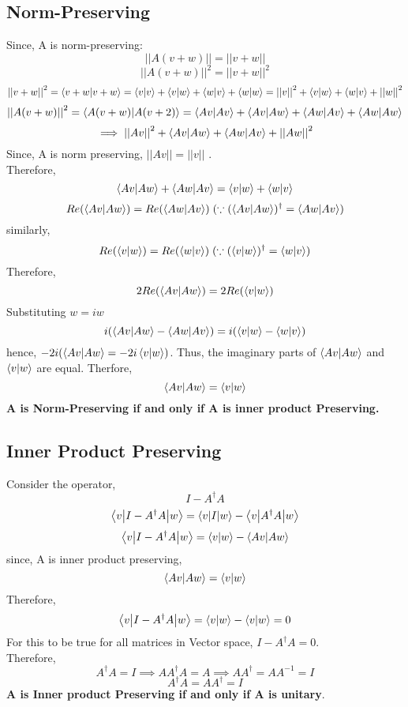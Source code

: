 \documentclass[11pt, a4paper]{article}
\begin{document}
\subsection{Norm-Preserving}
Since, A is norm-preserving:
\[
    \left\vert \left\vert A(v+w) \right\vert  \right\vert = \left\vert \left\vert v+w \right\vert  \right\vert 
\]
\[
    \left\vert \left\vert A(v+w) \right\vert  \right\vert^2 = \left\vert \left\vert v+w \right\vert  \right\vert^2
\]
\[
    \left\vert \left\vert v+w \right\vert  \right\vert^2 = \bkt{v+w}{v+w} = \bkt{v}{v}+ \bkt{v}{w}+\bkt{w}{v}+ \bkt{w}{w} = \left\vert \left\vert v \right\vert  \right\vert ^2 + \bkt{v}{w} + \bkt{w}{v}+ \left\vert \left\vert w \right\vert  \right\vert ^2
\]
\[
    \left\vert \left\vert A(v+w) \right\vert  \right\vert ^2 = \bkt{A(v+w)}{A(v+2)} = \bkt{Av}{Av} + \bkt{Av}{Aw} + \bkt{Aw}{Av}+ \bkt{Aw}{Aw} 
\]
\[
    \implies  \left\vert \left\vert Av \right\vert  \right\vert ^2 + \bkt{Av}{Aw} + \bkt{Aw}{Av}+ \left\vert \left\vert Aw \right\vert  \right\vert ^2
\]
Since, A is norm preserving, \(\left\vert \left\vert Av \right\vert  \right\vert = \left\vert \left\vert v \right\vert  \right\vert \) .\\
Therefore,
\[
    \bkt{Av}{Aw} + \bkt{Aw}{Av} = \bkt{v}{w}+\bkt{w}{v}
\]
\[
    Re(\bkt{Av}{Aw}) = Re(\bkt{Aw}{Av}) \; (\because (\bkt{Av}{Aw})^\dagger = \bkt{Aw}{Av})
\]
similarly,
\[
    Re(\bkt{v}{w}) = Re(\bkt{w}{v}) \; (\because (\bkt{v}{w})^\dagger = \bkt{w}{v})
\]
Therefore, 
\[
    2Re(\bkt{Av}{Aw}) = 2 Re(\bkt{v}{w})
\]
Substituting \(w=iw\) 
\[
    i(\bkt{Av}{Aw} - \bkt{Aw}{Av}) = i(\bkt{v}{w}-\bkt{w}{v})
\]
hence, \(-2i(\bkt{Av}{Aw} = -2i \bkt{v}{w})\). Thus, the imaginary parts of \(\bkt{Av}{Aw}\) and \(\bkt{v}{w}\) are equal. 
Therfore,
\[
    \bkt{Av}{Aw} = \bkt{v}{w}
\]
\textbf{A is Norm-Preserving if and only if A is inner product Preserving. }
\subsection{Inner Product Preserving}
Consider the operator,
\[
    I - A^\dagger A
\]
\[
    \braketmatrix{v}{I - A^\dagger A}{w} = \braketmatrix{v}{I}{w} - \braketmatrix{v}{A^\dagger A}{w}
\]
\[
    \braketmatrix{v}{I - A^\dagger A}{w} = \bkt{v}{w} - \bkt{A v}{A w} 
\]
since, A is inner product preserving,
\[
    \bkt{Av}{Aw} = \bkt{v}{w}
\]
Therefore,
\[
    \braketmatrix{v}{I - A^\dagger A}{w} = \bkt{v}{w}-\bkt{v}{w} = 0
\]
For this to be true for all matrices in Vector space, \(I-A^\dagger A = 0\). \\
Therefore,
\[
    A^\dagger A = I \implies A A^\dagger A = A \implies A A^\dagger = A A^{-1} = I 
\]
\[
    A^\dagger A = A A^\dagger = I
\]
\textbf{A is Inner product Preserving if and only if A is unitary}. 
\end{document}
